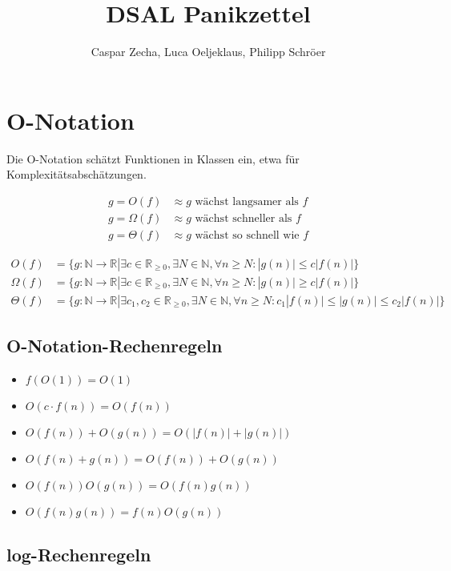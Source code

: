 \documentclass[11pt]{scrartcl}
\date{\small\filename@parse{\jobname}\IfFileExists{\filename@base.last-change}{}{\today}}
\title{DSAL Panikzettel}
\author{Caspar Zecha, Luca Oeljeklaus, Philipp Schröer}
\begin{document}
\maketitle

\setcounter{tocdepth}{2}
\tableofcontents

\section{O-Notation}

Die O-Notation schätzt Funktionen in Klassen ein, etwa für Komplexitätsabschätzungen.

\begin{align*}
g = O(f) &\approx g \text{ wächst langsamer als } f\\
g = \Omega(f) &\approx g \text{ wächst schneller als } f \\
g = \Theta(f) &\approx g \text{ wächst so schnell wie } f
\end{align*}

\begin{align*}
O(f) &= \{g: \mathbb{N}\to \mathbb{R}|\exists c \in \mathbb{R}_{\ge 0},\exists N \in \mathbb{N}, \forall n \ge N:|g(n)| \leq c|f(n)|\} \\
\Omega(f) &= \{g: \mathbb{N}\to \mathbb{R}|\exists c \in \mathbb{R}_{\ge 0},\exists N \in \mathbb{N}, \forall n \ge N:|g(n)| \ge c|f(n)|\} \\
\Theta(f) &= \{g: \mathbb{N}\to \mathbb{R}|\exists c_1,c_2 \in \mathbb{R}_{\ge 0},\exists N \in \mathbb{N}, \forall n \ge N:c_1|f(n)| \leq |g(n)| \leq c_2|f(n)|\}
\end{align*}

\subsection{O-Notation-Rechenregeln}
\begin{itemize}
	\item $f(O(1)) = O(1)$
	\item $O(c \cdot f(n))=O(f(n))$
    \item $O(f(n)) + O(g(n)) = O(|f(n)| + |g(n)|)$
    \item $O(f(n) + g(n)) = O(f(n)) + O(g(n))$
    \item $O(f(n))O(g(n)) = O(f(n)g(n))$
    \item $O(f(n)g(n)) = f(n)O(g(n))$
\end{itemize}

\subsection{log-Rechenregeln}
\end{document}
